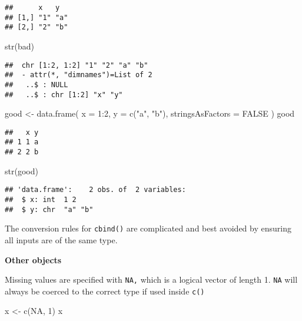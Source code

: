 \documentclass[
]{book}
\newenvironment{Shaded}{\begin{snugshade}}{\end{snugshade}}
\newcommand{\AttributeTok}[1]{\textcolor[rgb]{0.77,0.63,0.00}{#1}}
\newcommand{\ConstantTok}[1]{\textcolor[rgb]{0.00,0.00,0.00}{#1}}
\newcommand{\DecValTok}[1]{\textcolor[rgb]{0.00,0.00,0.81}{#1}}
\newcommand{\FunctionTok}[1]{\textcolor[rgb]{0.00,0.00,0.00}{#1}}
\newcommand{\NormalTok}[1]{#1}
\newcommand{\OtherTok}[1]{\textcolor[rgb]{0.56,0.35,0.01}{#1}}
\newcommand{\SpecialCharTok}[1]{\textcolor[rgb]{0.00,0.00,0.00}{#1}}
\newcommand{\StringTok}[1]{\textcolor[rgb]{0.31,0.60,0.02}{#1}}
\begin{document}
\begin{verbatim}
##      x   y  
## [1,] "1" "a"
## [2,] "2" "b"
\end{verbatim}

\begin{Shaded}
\begin{Highlighting}[]
\FunctionTok{str}\NormalTok{(bad)}
\end{Highlighting}
\end{Shaded}

\begin{verbatim}
##  chr [1:2, 1:2] "1" "2" "a" "b"
##  - attr(*, "dimnames")=List of 2
##   ..$ : NULL
##   ..$ : chr [1:2] "x" "y"
\end{verbatim}

\begin{Shaded}
\begin{Highlighting}[]
\NormalTok{good }\OtherTok{\textless{}{-}} \FunctionTok{data.frame}\NormalTok{(}
  \AttributeTok{x =} \DecValTok{1}\SpecialCharTok{:}\DecValTok{2}\NormalTok{, }\AttributeTok{y =} \FunctionTok{c}\NormalTok{(}\StringTok{"a"}\NormalTok{, }\StringTok{"b"}\NormalTok{),}
  \AttributeTok{stringsAsFactors =} \ConstantTok{FALSE}
\NormalTok{)}
\NormalTok{good}
\end{Highlighting}
\end{Shaded}

\begin{verbatim}
##   x y
## 1 1 a
## 2 2 b
\end{verbatim}

\begin{Shaded}
\begin{Highlighting}[]
\FunctionTok{str}\NormalTok{(good)}
\end{Highlighting}
\end{Shaded}

\begin{verbatim}
## 'data.frame':    2 obs. of  2 variables:
##  $ x: int  1 2
##  $ y: chr  "a" "b"
\end{verbatim}

The conversion rules for \texttt{cbind()} are complicated and best avoided by ensuring all inputs are of the same type.

\textbf{Other objects}

Missing values are specified with \texttt{NA,} which is a logical vector of length 1. \texttt{NA} will always be coerced to the correct type if used inside \texttt{c()}

\begin{Shaded}
\begin{Highlighting}[]
\NormalTok{x }\OtherTok{\textless{}{-}} \FunctionTok{c}\NormalTok{(}\ConstantTok{NA}\NormalTok{, }\DecValTok{1}\NormalTok{)}
\NormalTok{x}
\end{Highlighting}
\end{Shaded}
\end{document}

